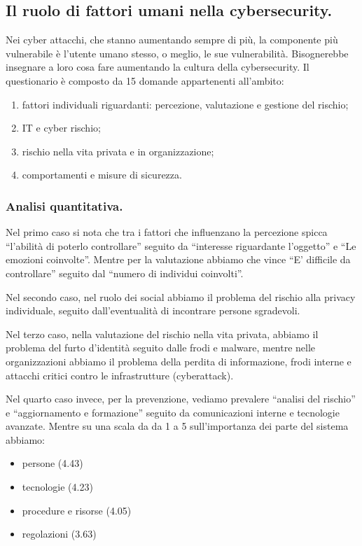 \documentclass[a4page, 11pt, twocolumn]{article}
\begin{document}
\subsection{Il ruolo di fattori umani nella cybersecurity.}
Nei cyber attacchi, che stanno aumentando sempre di più, la componente più vulnerabile è l'utente umano stesso, o meglio, le sue vulnerabilità.
Bisognerebbe insegnare a loro cosa fare aumentando la cultura della cybersecurity.
Il questionario è composto da 15 domande appartenenti all'ambito:
\begin{enumerate}
  \item fattori individuali riguardanti: percezione, valutazione e gestione del rischio;
  \item IT e cyber rischio;
  \item rischio nella vita privata e in organizzazione;
  \item comportamenti e misure di sicurezza.
\end{enumerate}

\subsubsection{Analisi quantitativa.}
Nel primo caso si nota che tra i fattori che influenzano la percezione spicca ``l'abilità di poterlo controllare'' seguito da ``interesse riguardante l'oggetto'' e ``Le emozioni coinvolte''.
Mentre per la valutazione abbiamo che vince ``E' difficile da controllare'' seguito dal ``numero di individui coinvolti''.

Nel secondo caso, nel ruolo dei social abbiamo il problema del rischio alla privacy individuale, seguito dall'eventualità di incontrare persone sgradevoli.

Nel terzo caso, nella valutazione del rischio nella vita privata, abbiamo il problema del furto d'identità seguito dalle frodi e malware, mentre nelle organizzazioni abbiamo il problema della perdita di informazione, frodi interne e attacchi critici contro le infrastrutture (cyberattack).

Nel quarto caso invece, per la prevenzione, vediamo prevalere ``analisi del rischio'' e ``aggiornamento e formazione'' seguito da comunicazioni interne e tecnologie avanzate.
Mentre su una scala da da 1 a 5 sull'importanza dei parte del sistema abbiamo:
\begin{itemize}
  \item persone (4.43)
  \item tecnologie (4.23)
  \item procedure e risorse (4.05)
  \item regolazioni (3.63)
\end{itemize}
\end{document}
